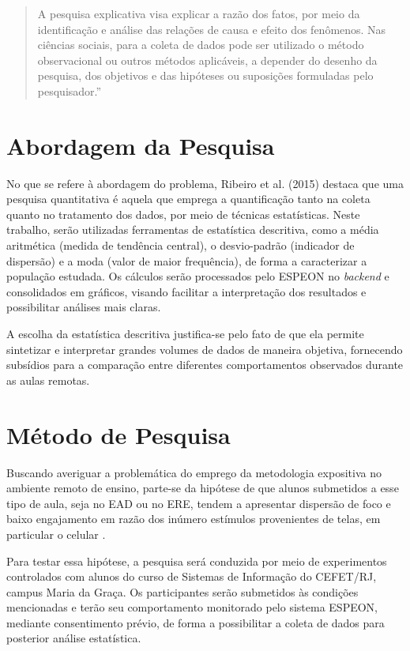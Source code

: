 \begin{quote}
    A pesquisa explicativa visa explicar a razão dos fatos, por meio da identificação e
    análise das relações de causa e efeito dos fenômenos. Nas ciências sociais, para a coleta de
    dados pode ser utilizado o método observacional ou outros métodos aplicáveis, a depender do
    desenho da pesquisa, dos objetivos e das hipóteses ou suposições formuladas pelo pesquisador.''
    \cite{sienaMetodologiaPesquisaCientifica2024}
\end{quote}

\section{Abordagem da Pesquisa}
No que se refere à abordagem do problema, Ribeiro et al. (2015) \cite{ribeiroManagementAccountingAnalysis2015} destaca que uma pesquisa quantitativa é aquela que emprega a quantificação tanto na coleta quanto no tratamento dos dados, por meio de técnicas estatísticas. Neste trabalho, serão utilizadas ferramentas de estatística descritiva, como a média aritmética (medida de tendência central), o desvio-padrão (indicador de dispersão) e a moda (valor de maior frequência), de forma a caracterizar a população estudada. Os cálculos serão processados pelo ESPEON no \textit{backend} e consolidados em gráficos, visando facilitar a interpretação dos resultados e possibilitar análises mais claras.

A escolha da estatística descritiva justifica-se pelo fato de que ela permite sintetizar e interpretar grandes volumes de dados de maneira objetiva, fornecendo subsídios para a comparação entre diferentes comportamentos observados durante as aulas remotas.


\section{Método de Pesquisa}
Buscando averiguar a problemática do emprego da metodologia expositiva no ambiente remoto de ensino, parte-se da hipótese de que alunos submetidos a esse tipo de aula, seja no EAD ou no ERE, tendem a apresentar dispersão de foco e baixo engajamento em razão dos inúmero estímulos provenientes de telas, em particular o celular \cite{lopesUsoCelularEm2017}.

Para testar essa hipótese, a pesquisa será conduzida por meio de experimentos controlados com alunos do curso de Sistemas de Informação do CEFET/RJ, campus Maria da Graça. Os participantes serão submetidos às condições mencionadas e terão seu comportamento monitorado pelo sistema ESPEON, mediante consentimento prévio, de forma a possibilitar a coleta de dados para posterior análise estatística.

